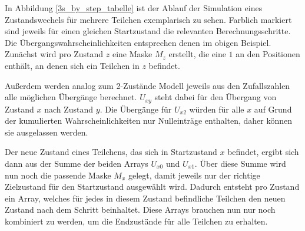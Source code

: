 In Abbildung \ref{3s_by_step_tabelle} ist der Ablauf der Simulation eines Zustandswechels für mehrere Teilchen exemplarisch zu sehen. Farblich markiert sind jeweils für einen gleichen Startzustand die relevanten Berechnungsschritte. Die Übergangswahrscheinlichkeiten entsprechen denen im obigen Beispiel.
Zunächst wird pro Zustand $z$ eine Maske $M_z$ erstellt, die eine $1$ an den Positionen enthält, an denen sich ein Teilchen in $z$ befindet. 

Außerdem werden analog zum 2-Zustände Modell jeweils aus den Zufallszahlen alle möglichen Übergänge berechnet. $U_{xy}$ steht dabei für den Übergang von Zustand $x$ nach Zustand $y$. Die Übergänge für $U_{x2}$ würden für alle $x$ auf Grund der kumulierten Wahrscheinlichkeiten nur Nulleinträge enthalten, daher können sie ausgelassen werden. 

Der neue Zustand eines Teilchens, das sich in Startzustand $x$ befindet, ergibt sich dann aus der Summe der beiden Arrays $U_{x0}$ und $U_{x1}$. Über diese Summe wird nun noch die passende Maske $M_x$ gelegt, damit jeweils nur der richtige Zielzustand für den Startzustand ausgewählt wird.
Dadurch entsteht pro Zustand ein Array, welches für jedes in diesem Zustand befindliche Teilchen den neuen Zustand nach dem Schritt beinhaltet. Diese Arrays brauchen nun nur noch kombiniert zu werden, um die Endzustände für alle Teilchen zu erhalten.

